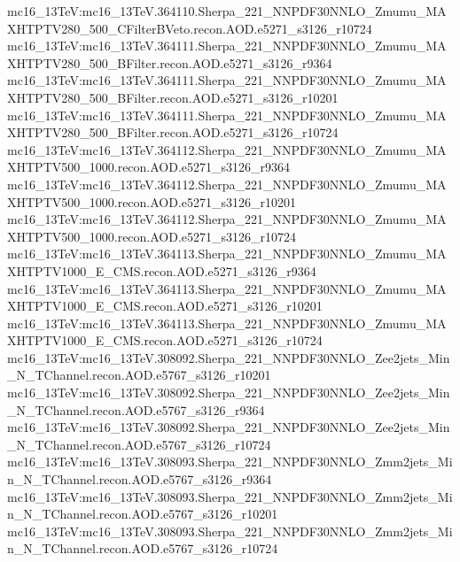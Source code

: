 { mc16\_13TeV:mc16\_13TeV.364110.Sherpa\_221\_NNPDF30NNLO\_Zmumu\_MAXHTPTV280\_500\_CFilterBVeto.recon.AOD.e5271\_s3126\_r10724 \newline    
 mc16\_13TeV:mc16\_13TeV.364111.Sherpa\_221\_NNPDF30NNLO\_Zmumu\_MAXHTPTV280\_500\_BFilter.recon.AOD.e5271\_s3126\_r9364 \newline    
 mc16\_13TeV:mc16\_13TeV.364111.Sherpa\_221\_NNPDF30NNLO\_Zmumu\_MAXHTPTV280\_500\_BFilter.recon.AOD.e5271\_s3126\_r10201 \newline    
 mc16\_13TeV:mc16\_13TeV.364111.Sherpa\_221\_NNPDF30NNLO\_Zmumu\_MAXHTPTV280\_500\_BFilter.recon.AOD.e5271\_s3126\_r10724 \newline    
 mc16\_13TeV:mc16\_13TeV.364112.Sherpa\_221\_NNPDF30NNLO\_Zmumu\_MAXHTPTV500\_1000.recon.AOD.e5271\_s3126\_r9364\newline     
 mc16\_13TeV:mc16\_13TeV.364112.Sherpa\_221\_NNPDF30NNLO\_Zmumu\_MAXHTPTV500\_1000.recon.AOD.e5271\_s3126\_r10201 \newline   
 mc16\_13TeV:mc16\_13TeV.364112.Sherpa\_221\_NNPDF30NNLO\_Zmumu\_MAXHTPTV500\_1000.recon.AOD.e5271\_s3126\_r10724 \newline    
 mc16\_13TeV:mc16\_13TeV.364113.Sherpa\_221\_NNPDF30NNLO\_Zmumu\_MAXHTPTV1000\_E\_CMS.recon.AOD.e5271\_s3126\_r9364 \newline    
 mc16\_13TeV:mc16\_13TeV.364113.Sherpa\_221\_NNPDF30NNLO\_Zmumu\_MAXHTPTV1000\_E\_CMS.recon.AOD.e5271\_s3126\_r10201 \newline    
 mc16\_13TeV:mc16\_13TeV.364113.Sherpa\_221\_NNPDF30NNLO\_Zmumu\_MAXHTPTV1000\_E\_CMS.recon.AOD.e5271\_s3126\_r10724 \newline    
 mc16\_13TeV:mc16\_13TeV.308092.Sherpa\_221\_NNPDF30NNLO\_Zee2jets\_Min\_N\_TChannel.recon.AOD.e5767\_s3126\_r10201 \newline    
 mc16\_13TeV:mc16\_13TeV.308092.Sherpa\_221\_NNPDF30NNLO\_Zee2jets\_Min\_N\_TChannel.recon.AOD.e5767\_s3126\_r9364 \newline    
 mc16\_13TeV:mc16\_13TeV.308092.Sherpa\_221\_NNPDF30NNLO\_Zee2jets\_Min\_N\_TChannel.recon.AOD.e5767\_s3126\_r10724 \newline    
 mc16\_13TeV:mc16\_13TeV.308093.Sherpa\_221\_NNPDF30NNLO\_Zmm2jets\_Min\_N\_TChannel.recon.AOD.e5767\_s3126\_r9364  \newline   
 mc16\_13TeV:mc16\_13TeV.308093.Sherpa\_221\_NNPDF30NNLO\_Zmm2jets\_Min\_N\_TChannel.recon.AOD.e5767\_s3126\_r10201  \newline   
 mc16\_13TeV:mc16\_13TeV.308093.Sherpa\_221\_NNPDF30NNLO\_Zmm2jets\_Min\_N\_TChannel.recon.AOD.e5767\_s3126\_r10724  \newline   
}

